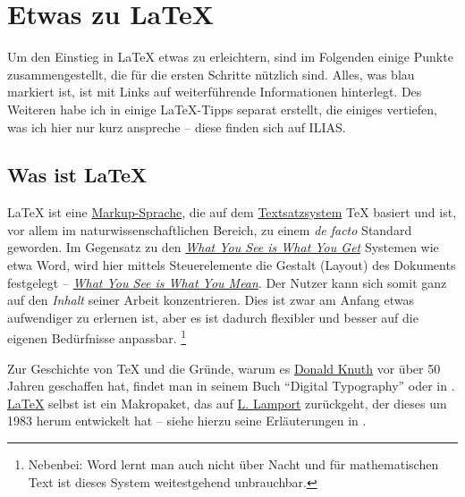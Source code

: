 \section{Etwas zu \LaTeX{}}
Um den Einstieg in \LaTeX{} etwas zu erleichtern, sind im Folgenden einige Punkte zusammengestellt, die für die ersten Schritte nützlich sind. 
Alles, was blau markiert ist, ist mit Links auf weiterführende Informationen hinterlegt.
Des Weiteren habe ich in einige \LaTeX{}-Tipps separat erstellt, die einiges vertiefen, was ich hier nur kurz anspreche -- diese finden sich auf ILIAS.

% 
\subsection{Was ist \LaTeX{}}
\LaTeX{} ist eine \href{https://de.wikipedia.org/wiki/Auszeichnungssprache}{Markup-Sprache}, die auf dem \href{https://de.wikipedia.org/wiki/Satz_(Druck)}{Textsatzsystem} \TeX{} basiert und ist, vor allem im naturwissenschaftlichen Bereich, zu einem \emph{de facto} Standard geworden.
Im Gegensatz zu den \href{https://de.wikipedia.org/wiki/WYSIWYG}{\emph{What You See is What You Get}} Systemen wie etwa Word, wird hier mittels Steuerelemente die Gestalt (Layout) des Dokuments festgelegt 
-- \href{https://de.wikipedia.org/wiki/WYSIWYM}{\emph{What You See is What You Mean}}.
Der Nutzer kann sich somit ganz auf den \emph{Inhalt} seiner Arbeit konzentrieren.
Dies ist zwar am Anfang etwas aufwendiger zu erlernen ist, aber es ist dadurch flexibler und besser auf die eigenen Bedürfnisse anpassbar.%
\footnote{Nebenbei: Word lernt man auch nicht über Nacht und für mathematischen Text ist dieses System weitestgehend unbrauchbar.}

Zur Geschichte von \TeX{} und die Gründe, warum es \href{https://de.wikipedia.org/wiki/Donald_E._Knuth}{Donald Knuth} vor über 50 Jahren geschaffen hat, findet man in seinem Buch \enquote{Digital Typography} \cite{knuth:digital} oder in \textcite{beeton:math}.
\href{https://de.wikipedia.org/wiki/LaTeX}{\LaTeX{}} selbst ist ein Makropaket, das auf \href{https://de.wikipedia.org/wiki/Leslie_Lamport}{L. Lamport} zurückgeht, der dieses um 1983 herum entwickelt hat -- siehe hierzu seine Erläuterungen in \cite{lamport:dmv}.

